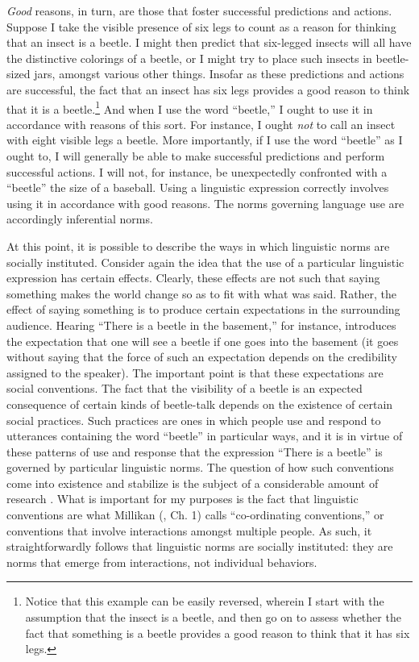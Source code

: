 \textit{Good} reasons, in turn, are those that foster successful predictions and actions. Suppose I take the visible presence of six legs to count as a reason for thinking that an insect is a beetle. I might then predict that six-legged insects will all have the distinctive colorings of a beetle, or I might try to place such insects in beetle-sized jars, amongst various other things. Insofar as these predictions and actions are successful, the fact that an insect has six legs provides a good reason to think that it is a beetle.\footnote{Notice that this example can be easily reversed, wherein I start with the assumption that the insect is a beetle, and then go on to assess whether the fact that something is a beetle provides a good reason to think that it has six legs.} And when I use the word ``beetle,'' I ought to use it in accordance with reasons of this sort. For instance, I ought \textit{not} to call an insect with eight visible legs a beetle. More importantly, if I use the word ``beetle'' as I ought to, I will generally be able to make successful predictions and perform successful actions. I will not, for instance, be unexpectedly confronted with a ``beetle'' the size of a baseball. Using a linguistic expression correctly involves using it in accordance with good reasons. The norms governing language use are accordingly inferential norms. 

At this point, it is possible to describe the ways in which linguistic norms are socially instituted. Consider again the idea that the use of a particular linguistic expression has certain effects. Clearly, these effects are not such that saying something makes the world change so as to fit with what was said. Rather, the effect of saying something is to produce certain expectations in the surrounding audience. Hearing ``There is a beetle in the basement,'' for instance, introduces the expectation that one will see a beetle if one goes into the basement (it goes without saying that the force of such an expectation depends on the credibility assigned to the speaker). The important point is that these expectations are social conventions. The fact that the visibility of a beetle is an expected consequence of certain kinds of beetle-talk depends on the existence of certain social practices. Such practices are ones in which people use and respond to utterances containing the word ``beetle'' in particular ways, and it is in virtue of these patterns of use and response that the expression ``There is a beetle'' is governed by particular linguistic norms. The question of how such conventions come into existence and stabilize is the subject of a considerable amount of research \citep[see, e.g.,][]{Millikan:2005}. What is important for my purposes is the fact that linguistic conventions are what Millikan (\citeyear{Millikan:2005}, Ch. 1) calls ``co-ordinating conventions,'' or conventions that involve interactions amongst multiple people. As such, it straightforwardly follows that linguistic norms are socially instituted: they are norms that emerge from interactions, not individual behaviors.

